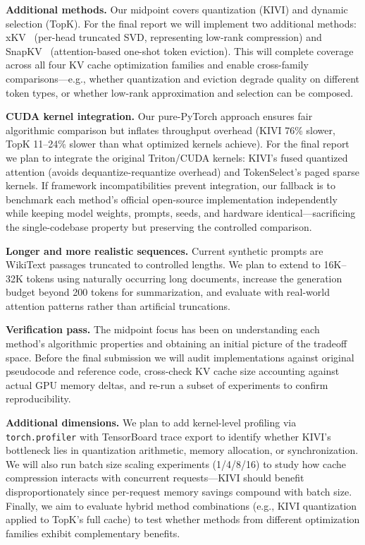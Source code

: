 \documentclass[conference]{IEEEtran}
\begin{document}
\textbf{Additional methods.} Our midpoint covers quantization (KIVI) and dynamic selection (TopK). For the final report we will implement two additional methods: xKV~\cite{xkv} (per-head truncated SVD, representing low-rank compression) and SnapKV~\cite{snapkv} (attention-based one-shot token eviction). This will complete coverage across all four KV cache optimization families and enable cross-family comparisons---e.g., whether quantization and eviction degrade quality on different token types, or whether low-rank approximation and selection can be composed.

\textbf{CUDA kernel integration.} Our pure-PyTorch approach ensures fair algorithmic comparison but inflates throughput overhead (KIVI 76\% slower, TopK 11--24\% slower than what optimized kernels achieve). For the final report we plan to integrate the original Triton/CUDA kernels: KIVI's fused quantized attention (avoids dequantize-requantize overhead) and TokenSelect's paged sparse kernels. If framework incompatibilities prevent integration, our fallback is to benchmark each method's official open-source implementation independently while keeping model weights, prompts, seeds, and hardware identical---sacrificing the single-codebase property but preserving the controlled comparison.

\textbf{Longer and more realistic sequences.} Current synthetic prompts are WikiText passages truncated to controlled lengths. We plan to extend to 16K--32K tokens using naturally occurring long documents, increase the generation budget beyond 200 tokens for summarization, and evaluate with real-world attention patterns rather than artificial truncations.

\textbf{Verification pass.} The midpoint focus has been on understanding each method's algorithmic properties and obtaining an initial picture of the tradeoff space. Before the final submission we will audit implementations against original pseudocode and reference code, cross-check KV cache size accounting against actual GPU memory deltas, and re-run a subset of experiments to confirm reproducibility.

\textbf{Additional dimensions.} We plan to add kernel-level profiling via \texttt{torch.profiler} with TensorBoard trace export to identify whether KIVI's bottleneck lies in quantization arithmetic, memory allocation, or synchronization. We will also run batch size scaling experiments (1/4/8/16) to study how cache compression interacts with concurrent requests---KIVI should benefit disproportionately since per-request memory savings compound with batch size. Finally, we aim to evaluate hybrid method combinations (e.g., KIVI quantization applied to TopK's full cache) to test whether methods from different optimization families exhibit complementary benefits.
\end{document}
